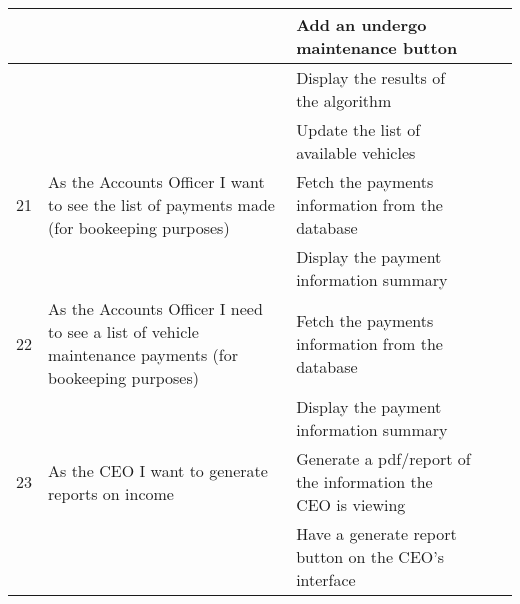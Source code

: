\documentclass[paper=a4, fontsize=11pt]{scrartcl} %
\numberwithin{equation}{section} %
\numberwithin{figure}{section} %
\numberwithin{table}{section} %
\begin{document}
\begin{table}[]
\begin{tabular}{|p{1cm}|p{4cm}|p{4cm}|p{2cm}|p{2cm}|}
            &                                                                                                        & Add an undergo maintenance button                                                 &               &                     \\ \hline
            &                                                                                                        & Display the results of the algorithm                                              &               &                     \\ \hline
            &                                                                                                        & Update the list of available vehicles                                             &               &                     \\ \hline
21          & As the Accounts Officer I want to see the list of payments made (for bookeeping purposes)              & Fetch the payments information from the database                                  &               &                     \\ \hline
            &                                                                                                        & Display the payment information summary                                           &               &                     \\ \hline
22          & As the Accounts Officer I need to see a list of vehicle maintenance payments (for bookeeping purposes) & Fetch the payments information from the database                                  &               &                     \\ \hline
            &                                                                                                        & Display the payment information summary                                           &               &                     \\ \hline
23          & As the CEO I want to generate reports on income                                                        & Generate a pdf/report of the information the CEO is viewing                       &               &                     \\ \hline
            &                                                                                                        & Have a generate report button on the CEO's interface                              &               &                     \\ \hline

\end{tabular}
\end{table}
\end{document}
